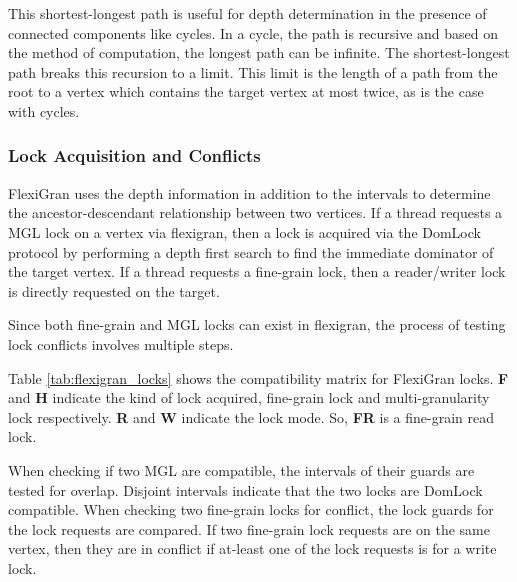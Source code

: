 This shortest-longest path is useful for depth determination in the presence of connected components like cycles. In a cycle, the path is recursive and based on the method of computation, the longest path can be infinite. The shortest-longest path breaks this recursion to a limit. This limit is the length of a path from the root to a vertex which contains the target vertex at most twice, as is the case with cycles. 

\subsubsection{Lock Acquisition and Conflicts}

FlexiGran uses the depth information in addition to the intervals to determine the ancestor-descendant relationship between two vertices. 
If a thread requests a MGL lock on a vertex via flexigran, then a lock is acquired via the DomLock protocol by performing a depth first search to find the immediate dominator of the target vertex.
If a thread requests a fine-grain lock, then a reader/writer lock is directly requested on the target. 

Since both fine-grain and MGL locks can exist in flexigran, the process of testing lock conflicts involves multiple steps. 

Table \ref{tab:flexigran_locks} shows the compatibility matrix for FlexiGran locks. \textbf{F} and \textbf{H} indicate the kind of lock acquired, fine-grain lock and multi-granularity lock respectively. \textbf{R} and \textbf{W} indicate the lock mode. So, \textbf{FR} is a fine-grain read lock.

When checking if two MGL are compatible, the intervals of their guards are tested for overlap. Disjoint intervals indicate that the two locks are DomLock compatible. When checking two fine-grain locks for conflict, the lock guards for the lock requests are compared. If two fine-grain lock requests are on the same vertex, then they are in conflict if at-least one of the lock requests is for a write lock.


